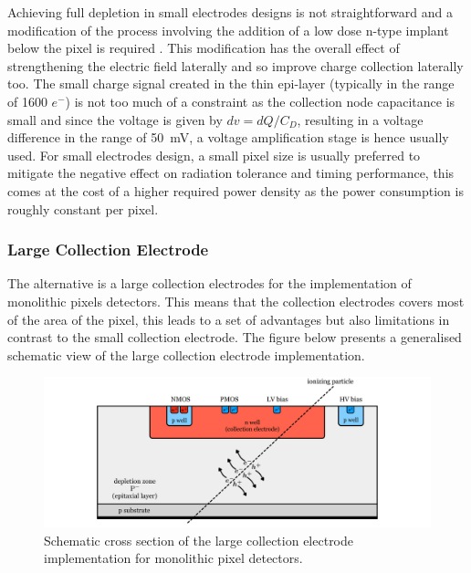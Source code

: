 		Achieving full depletion in small electrodes designs is not straightforward and a modification of the process involving the addition of a low dose n-type implant below the pixel is required \cite{thanu_small_electrode}. This modification has the overall effect of strengthening the electric field laterally and so improve charge collection laterally too. The small charge signal created in the thin epi-layer (typically in the range of 1600 $e^-$)\cite{detectors} is not too much of a constraint as the collection node capacitance is small and since the voltage is given by $dv = dQ/C_D$, resulting in a voltage difference in the range of \SI{50}{\milli\volt}, a voltage amplification stage is hence usually used. 
		For small electrodes design, a small pixel size is usually preferred to mitigate the negative effect on radiation tolerance and timing performance, this comes at the cost of a higher required power density as the power consumption is roughly constant per pixel. 
		
		
		\subsubsection{Large Collection Electrode}
		The alternative is a large collection electrodes for the implementation of monolithic pixels detectors. This means that the collection electrodes covers most of the area of the pixel, this leads to a set of advantages but also limitations in contrast to the small collection electrode. The figure below presents a generalised schematic view of the large collection electrode implementation. 
		\begin{figure}[h]
			\centering
			\includegraphics[width=0.9\linewidth]{files/MAPS_large_electrode}
			\caption{Schematic cross section of the large collection electrode implementation for monolithic pixel detectors.}
			\label{im:large_collection_electrode}
		\end{figure} 
		
